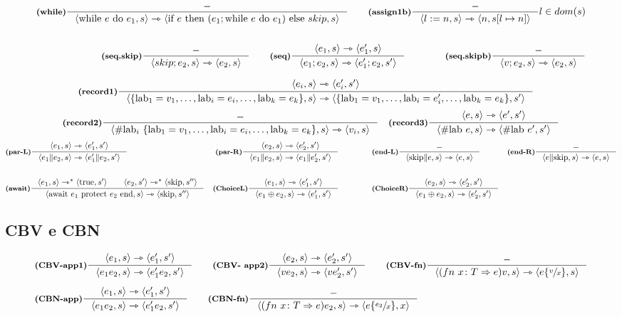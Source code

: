 \documentclass[a4paper, 10pt]{article}
\newcommand{\infer}[4]{\inference[\textbf{#1}]{#2}{#3}#4 }
\newcommand{\srule}[2]{\langle #1 \rangle \rightarrowtriangle \langle #2 \rangle}
\newcommand{\ssrule}[2]{\langle #1 \rangle \rightarrowtriangle^{*} \langle #2 \rangle}
\newcommand{\memrep}[3]{#1 \lbrack #2 \mapsto #3 \rbrack}
\newcommand{\subs}[3]{#1 \lbrace \sfrac{#2}{#3} \rbrace}
\begin{document}
	\begin{align*}
		\infer{(while)}{-}{\srule{\text{while } e \text{ do } e_1, s}{\text{if } e \text{ then } (e_1; \text{while } e \text{ do } e_1) \text{ else } skip, s}}{}\qquad
		\infer{(assign1b)}{-}{\srule{l:=n,s}{n, \memrep{s}{l}{n}}}{l \in dom(s)} \\ \\
		\infer{(seq.skip)}{-}{\srule{skip;e_2,s}{e_2,s}}{}\qquad
		\infer{(seq)}{\srule{e_1,s}{e_1',s}}{\srule{e_1;e_2,s}{e_1';e_2,s'}}{}\qquad\qquad
		\infer{(seq.skipb)}{-}{\srule{v;e_2,s}{e_2,s}}{}
	\end{align*}
	\newpage
	\begin{minipage}{.45\linewidth}
		\begin{flushleft}
			\begin{align*}
				&\infer{(record1)}{\srule{e_i, s}{e_i', s'}}{\srule{\{\text{lab}_1 = v_1, \dots, \text{lab}_i = e_i, \dots, \text{lab}_k = e_k \}, s}{\{\text{lab}_1 = v_1, \dots, \text{lab}_i = e_i', \dots, \text{lab}_k = e_k \}, s'}}{}
			\end{align*}
			\begin{align*}
				&\infer{(record2)}{-}{\srule{\# \text{lab}_i\ \{\text{lab}_1 = v_1, \dots, \text{lab}_i = e_i, \dots, \text{lab}_k = e_k \}, s}{v_i, s}}{}
				&\infer{(record3)}{\srule{e, s}{e', s'}}{\srule{\# \text{lab } e, s}{\# \text{lab } e', s'}}{}
			\end{align*}
			\begin{align*}
				&\infer{(par-L)}{\srule{e_1,s}{e_1', s'}}{\srule{e_1\| e_2, s}{e_1'\| e_2 , s'}}{}
				&\infer{(par-R)}{\srule{e_2,s}{e_2', s'}}{\srule{e_1\| e_2, s}{e_1\| e_2' , s'}}{}\qquad\qquad
				&\infer{(end-L)}{-}{\srule{\textup{skip}\| e, s}{e , s}}{}
				&\infer{(end-R)}{-}{\srule{e \| \textup{skip}, s}{e , s}}{} \\ \\
				&\infer{(await)}{\ssrule{e_1, s}{\textup{true}, s'}\qquad \ssrule{e_2, s'}{\textup{skip}, s''}}{
					\srule{\textup{await}\ e_1\ \textup{protect}\ e_2\ \textup{end}, s}{\textup{skip}, s''}}{}  
				&\infer{(ChoiceL)}{\srule{e_1, s}{e_1', s'}}{\srule{e_1 \oplus e_2, s}{e_1', s'}}{} \qquad\qquad
				&\infer{(ChoiceR)}{\srule{e_2, s}{e_2', s'}}{\srule{e_1 \oplus e_2, s}{e_2', s'}}{} 
			\end{align*}
		\end{flushleft}
	\end{minipage}
\subsection*{CBV e CBN}
	\begin{align*}
		&\infer{(CBV-app1)}{\srule{e_1, s}{e_1', s'}}{\srule{e_1 e_2, s}{e_1'e_2, s'}}{} \qquad
		\infer{(CBV- app2)}{\srule{e_2, s}{e_2', s'}}{\srule{ve_2, s}{ve_2', s'}}{} \qquad
		\infer{(CBV-fn)}{-}{\srule{(fn\ x\colon T\Rightarrow e)v, s}{\subs{e}{v}{x}, s}}{} \\ \\
		&\infer{(CBN-app)}{\srule{e_1, s}{e_1', s'}}{\srule{e_1e_2, s}{e_1'e_2, s'}}{} \qquad
		\infer{(CBN-fn)}{-}{\srule{(fn\ x\colon T\Rightarrow e)e_2, s}{\subs{e}{e_2}{x},x}}{}
	\end{align*}
	\newpage
	
\end{document}
